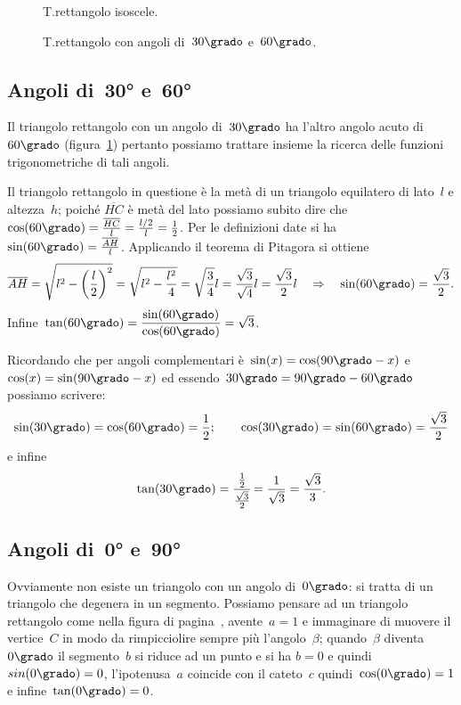 \begin{figure}[t]
\begin{minipage}[t]{.45\textwidth}
 \centering
 
 \caption{T.rettangolo isoscele.}\label{fig:C.1}
\end{minipage}\hfil
\begin{minipage}[t]{.45\textwidth}
 \centering
 
 \caption{T.rettangolo con angoli di~$30\grado$ e~$60\grado$.}\label{fig:C.2}
\end{minipage}
\end{figure}

\subsection{Angoli di~30° e~60°}

Il triangolo rettangolo con un angolo di~$30\grado$ ha l'altro angolo acuto di~$60\grado$ (figura~\ref{fig:C.2}) pertanto possiamo trattare insieme
la ricerca delle funzioni trigonometriche di tali angoli.

Il triangolo rettangolo in questione è la metà di un triangolo equilatero di lato~$l$ e altezza~$h$; poiché $\overline{HC}$ è metà del lato
possiamo subito dire che~$\cos(60\grado)=\frac{\overline{HC}}{l}=\frac{l/2}{l}=\frac{1}{2}$.
Per le definizioni date si ha~$\sin(60\grado)=\frac{\overline{AH}}{l}$.
Applicando il teorema di Pitagora si ottiene
\[\overline{AH}=\sqrt{l^{2}-\left(\frac{l}{2}\right)^{2}}=\sqrt{l^2-\frac{l^2}{4}}=
\sqrt{\frac{3}{4}}l=\frac{\sqrt{3}}{\sqrt{4}}l=\frac{\sqrt{3}}{2}l
\quad\Rightarrow\quad\sin(60\grado)=\frac{\sqrt{3}}{2}.\]
Infine~$\tan(60\grado)=\dfrac{\sin(60\grado)}{\cos(60\grado)}=\sqrt{3}$.

Ricordando che per angoli complementari è~$\sin(x)=\cos(90\grado-x)$ e~$\cos(x)=\sin(90\grado-x)$
ed essendo~$30\grado=90\grado-60\grado$ possiamo scrivere:
\[\sin(30\grado)=\cos(60\grado)=\frac{1}{2};\qquad\cos(30\grado)=\sin(60\grado)=\frac{\sqrt{3}}{2}\]
e infine
\[\tan(30\grado)=\cfrac{\frac{1}{2}}{\frac{\sqrt{3}}{2}}=\frac{1}{\sqrt{3}}=\frac{\sqrt{3}}{3}.\]%

\subsection{Angoli di~0° e~90°}

Ovviamente non esiste un triangolo con un angolo di~$0\grado$: si tratta di un triangolo che degenera in un segmento.
Possiamo pensare ad un triangolo rettangolo come nella figura di pagina~\pageref{fig:triangolo_rettangolo}, avente~$a=1$ e immaginare di muovere il vertice~$C$ in modo da rimpicciolire
sempre più l'angolo~$\beta$; quando~$\beta$ diventa~$0\grado$ il segmento~$b$ si riduce ad un punto e si ha
$b=0$ e quindi~$sin(0\grado)=0$, l'ipotenusa~$a$ coincide con il cateto~$c$ quindi~$\cos(0\grado)=1$ e infine~$\tan(0\grado)=0$.

